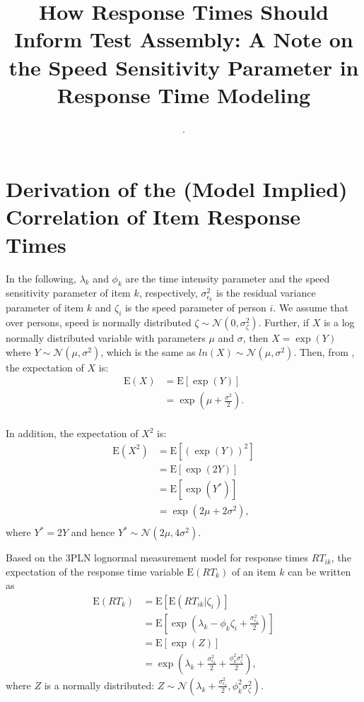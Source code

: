 \documentclass[a4paper,man,apacite,donotrepeattitle]{apa6}
\title{How Response Times Should Inform Test Assembly: A Note on the Speed Sensitivity Parameter in Response Time Modeling
\vspace{3cm}}
\author{\color{white}.}
\affiliation{\color{white}.}
\newcommand{\E}{\mathrm{E}}
\begin{document}
\appendix

\section{Derivation of the (Model Implied) Correlation of Item Response Times}
In the following, $\lambda_{k}$ and $\phi_{k}$ are the time intensity parameter and the speed sensitivity parameter of item $k$, respectively, $\sigma^2_{\epsilon_{k}}$ is the residual variance parameter of item $k$ and $\zeta_i$ is the speed parameter of person $i$. We assume that over persons, speed is normally distributed $\zeta \sim \mathcal{N}(0, \sigma^2_{\zeta})$. Further, if $X$ is a log normally distributed variable with parameters $\mu$ and $\sigma$, then $X = \exp(Y)$ where $Y \sim \mathcal{N}(\mu, \sigma^2)$, which is the same as $ln(X) \sim \mathcal{N}(\mu, \sigma^2)$. Then, from , the expectation of $X$ is:
\begin{equation}
\label{ElogNorm}
\begin{split}
\E(X) & = \E[\exp (Y)] \\
      & = \exp \left(\mu + \frac{\sigma^2}{2} \right). \\
\end{split}
\end{equation}

In addition, the expectation of $X^2$ is: 
\begin{equation}
\label{E2logNorm}
\begin{split}
\E(X^2) & = \E[(\exp (Y))^2] \\
        & = \E[\exp (2Y)] \\
        & = \E[\exp (Y^*)] \\        
        & = \exp \left(2 \mu + 2 \sigma^2 \right), \\
\end{split}
\end{equation}
where $Y^* = 2Y$ and hence $Y^* \sim \mathcal{N}(2\mu, 4\sigma^2)$.

Based on the 3PLN lognormal measurement model for response times $RT_{ik}$, the expectation of the response time variable $\E(RT_k)$ of an item $k$ can be written as
\begin{equation}
\label{meanRT}
\begin{split}
\E(RT_k) & = \E \left[ \E(RT_{ik} | \zeta_i)  \right] \\
         & = \E \left[ \exp \left( \lambda_{k} - \phi_{k} \zeta_i + \frac{\sigma^2_{\epsilon_{k}}}{2} \right) \right]  \\
         & = \E \left[ \exp( Z ) \right] \\
         & = \exp \left( \lambda_{k} + \frac{\sigma^2_{\epsilon_{k}}}{2} + \frac{\phi^2_{k} \sigma^2_{\zeta}}{2} \right),
\end{split}
\end{equation}
where $Z$ is a normally distributed: $ Z \sim \mathcal{N} (\lambda_{k} + \frac{\sigma^2_{\epsilon_{k}}}{2}, \phi^2_{k} \sigma^2_{\zeta})$.
\end{document}
